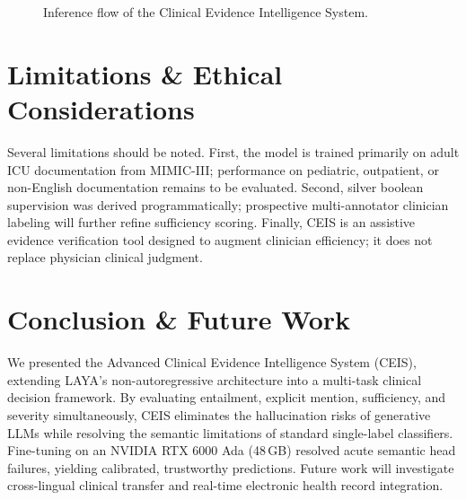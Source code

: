 \documentclass[10pt,conference]{IEEEtran}
\begin{document}
\begin{figure}[t]
\centering
{}
\caption{Inference flow of the Clinical Evidence Intelligence System.}
\label{fig:arch}
\end{figure}

\section{Limitations \& Ethical Considerations}
Several limitations should be noted. First, the model is trained primarily on adult ICU documentation from MIMIC-III; performance on pediatric, outpatient, or non-English documentation remains to be evaluated. Second, silver boolean supervision was derived programmatically; prospective multi-annotator clinician labeling will further refine sufficiency scoring. Finally, CEIS is an assistive evidence verification tool designed to augment clinician efficiency; it does not replace physician clinical judgment.

\section{Conclusion \& Future Work}
We presented the Advanced Clinical Evidence Intelligence System (CEIS), extending LAYA's non-autoregressive architecture into a multi-task clinical decision framework. By evaluating entailment, explicit mention, sufficiency, and severity simultaneously, CEIS eliminates the hallucination risks of generative LLMs while resolving the semantic limitations of standard single-label classifiers. Fine-tuning on an NVIDIA RTX 6000 Ada (48\,GB) resolved acute semantic head failures, yielding calibrated, trustworthy predictions. Future work will investigate cross-lingual clinical transfer and real-time electronic health record integration.
\end{document}
